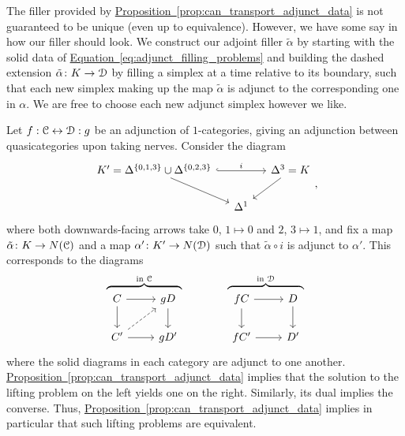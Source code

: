 \documentclass[main.tex]{subfiles}
\begin{document}
\begin{note}
  \label{note:can_pick_which_simplex_in_construction_of_adjunct_filling}
  The filler provided by \hyperref[prop:can_transport_adjunct_data]{Proposition~\ref*{prop:can_transport_adjunct_data}} is not guaranteed to be unique (even up to equivalence). However, we have some say in how our filler should look. We construct our adjoint filler $\tilde{\alpha}$ by starting with the solid data of \hyperref[eq:adjunct_filling_problems]{Equation~\ref*{eq:adjunct_filling_problems}} and building the dashed extension $\tilde{\alpha}\colon K \to \mathcal{D}$ by filling a simplex at a time relative to its boundary, such that each new simplex making up the map $\tilde{\alpha}$ is adjunct to the corresponding one in $\alpha$. We are free to choose each new adjunct simplex however we like.
\end{note}

\begin{example}
  Let $f : \mathcal{C} \leftrightarrow \mathcal{D} : g$ be an adjunction of $1$-categories, giving an adjunction between quasicategories upon taking nerves. Consider the diagram
  \begin{equation*}
    \begin{tikzcd}[column sep=small]
      K' = \Delta^{\{0,1,3\}} \cup \Delta^{\{0,2,3\}}
      \arrow[dr]
      \arrow[rr, hook, "i"]
      && \Delta^{3} = K
      \arrow[dl]
      \\
      & \Delta^{1}
    \end{tikzcd},
  \end{equation*}
  where both downwards-facing arrows take $0$, $1 \mapsto 0$ and $2$, $3 \mapsto 1$, and fix a map $\tilde{\alpha}\colon K \to N(\mathcal{C})$ and a map $\alpha'\colon K' \to N(\mathcal{D})$ such that $\tilde{\alpha} \circ i$ is adjunct to $\alpha'$. This corresponds to the diagrams
  \begin{equation*}
    \overbrace{
      \begin{tikzcd}[ampersand replacement=\&]
        C
        \arrow[r]
        \arrow[d]
        \& gD
        \arrow[d]
        \\
        C'
        \arrow[r]
        \arrow[ur, dashed]
        \& gD'
      \end{tikzcd}
    }^{\text{in } \category{C}}
    \qquad\qquad
    \overbrace{\begin{tikzcd}[ampersand replacement=\&]
      fC
      \arrow[r]
      \arrow[d]
      \& D
      \arrow[d]
      \\
      fC'
      \arrow[r]
      \& D'
    \end{tikzcd}}^{\text{in }\category{D}}
  \end{equation*}
  where the solid diagrams in each category are adjunct to one another.
  \hyperref[prop:can_transport_adjunct_data]{Proposition~\ref*{prop:can_transport_adjunct_data}} implies that the solution to the lifting problem on the left yields one on the right. Similarly, its dual implies the converse. Thus, \hyperref[prop:can_transport_adjunct_data]{Proposition~\ref*{prop:can_transport_adjunct_data}} implies in particular that such lifting problems are equivalent.
\end{example}
\end{document}
